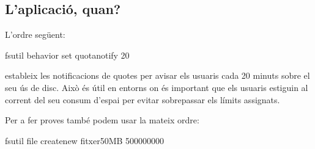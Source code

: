 \documentclass[
  a4paper,
]{article}
\newenvironment{Shaded}{\begin{snugshade}}{\end{snugshade}}
\newcommand{\NormalTok}[1]{#1}
\begin{document}
\subsection{L'aplicació, quan?}\label{laplicaciuxf3-quan}

L'ordre següent:

\begin{Shaded}
\begin{Highlighting}[]
\NormalTok{fsutil behavior set quotanotify 20}
\end{Highlighting}
\end{Shaded}

estableix les notificacions de quotes per avisar els usuaris cada 20
minuts sobre el seu ús de disc. Això és útil en entorns on és important
que els usuaris estiguin al corrent del seu consum d'espai per evitar
sobrepassar els límits assignats.

Per a fer proves també podem usar la mateix ordre:

\begin{Shaded}
\begin{Highlighting}[]
\NormalTok{fsutil file createnew fitxer50MB 500000000}
\end{Highlighting}
\end{Shaded}
\end{document}

